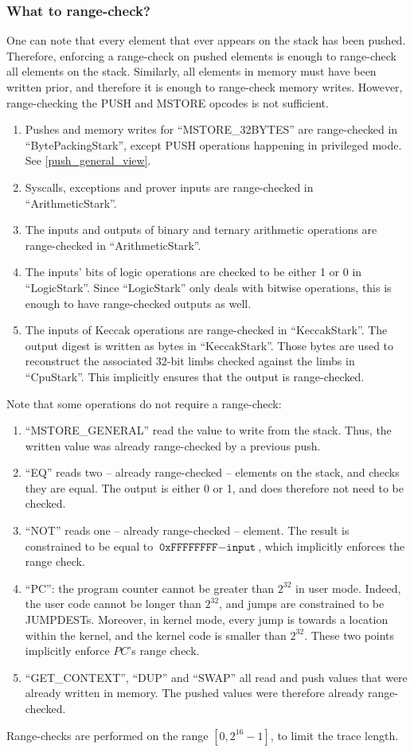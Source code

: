 \subsubsection{What to range-check?}
One can note that every element that ever appears on the stack has been pushed. Therefore, enforcing a range-check on pushed elements is enough to range-check all elements on the stack. Similarly, all elements in memory must have been written prior, and therefore it is enough to range-check memory writes. However, range-checking the PUSH and MSTORE opcodes is not sufficient.
\begin{enumerate}
  \item Pushes and memory writes for ``MSTORE\_32BYTES'' are range-checked in ``BytePackingStark'', except PUSH operations happening in privileged mode. See \ref{push_general_view}.
  \item Syscalls, exceptions and prover inputs are range-checked in ``ArithmeticStark''.
  \item The inputs and outputs of binary and ternary arithmetic operations are range-checked in ``ArithmeticStark''.
  \item The inputs' bits of logic operations are checked to be either 1 or 0 in ``LogicStark''. Since ``LogicStark'' only deals with bitwise operations, this is enough to have range-checked outputs as well.
  \item The inputs of Keccak operations are range-checked in ``KeccakStark''. The output digest is written as bytes in ``KeccakStark''. Those bytes are used to reconstruct the associated 32-bit limbs checked against the limbs in ``CpuStark''. This implicitly ensures that the output is range-checked.
\end{enumerate}
Note that some operations do not require a range-check:
\begin{enumerate}
  \item ``MSTORE\_GENERAL'' read the value to write from the stack. Thus, the written value was already range-checked by a previous push.
  \item ``EQ'' reads two -- already range-checked -- elements on the stack, and checks they are equal. The output is either 0 or 1, and does therefore not need to be checked.
  \item ``NOT'' reads one -- already range-checked -- element. The result is constrained to be equal to $\texttt{0xFFFFFFFF} - \texttt{input}$, which implicitly enforces the range check.
  \item ``PC'': the program counter cannot be greater than $2^{32}$ in user mode. Indeed, the user code cannot be longer than $2^{32}$, and jumps are constrained to be JUMPDESTs. Moreover, in kernel mode, every jump is towards a location within the kernel, and the kernel code is smaller than $2^{32}$. These two points implicitly enforce $PC$'s range check.
  \item ``GET\_CONTEXT'', ``DUP'' and ``SWAP'' all read and push values that were already written in memory. The pushed values were therefore already range-checked.
\end{enumerate}
Range-checks are performed on the range $[0, 2^{16} - 1]$, to limit the trace length.

